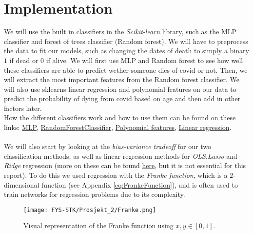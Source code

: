 \documentclass[english,notitlepage,reprint,nofootinbib]{revtex4-1}  %
\begin{document}
\section{Implementation}\label{sec: IMPLEMENTATION}
We will use the built in classifiers in the \emph{Scikit-learn} library, such as the MLP classifier and forest of trees classifier (Random forest). We will have to preprocess the data to fit our models, such as changing the dates of death to simply a binary $1$ if dead or $0$ if alive. We will first use MLP and Random forest to see how well these classifiers are able to predict wether someone dies of covid or not. Then, we will extract the most important features from the Random forest classifier. We will also use sklearns linear regression and polynomial features on our data to predict the probability of dying from covid based on age and then add in other factors later. 
\\
How the different classifiers work and how to use them can be found on these links: 
\href{https://scikit-learn.org/stable/modules/generated/sklearn.neural_network.MLPClassifier.html}{MLP},
\href{https://scikit-learn.org/stable/modules/generated/sklearn.ensemble.RandomForestClassifier.html}{RandomForestClassifier},
\href{https://scikit-learn.org/stable/modules/generated/sklearn.preprocessing.PolynomialFeatures.html}{Polynomial features},
\href{https://scik,it-learn.org/stable/modules/generated/sklearn.linear_model.LinearRegression.html}{Linear regression}.
\\
\\
We will also start by looking at the \textit{bias-variance tradeoff} for our two classification methods, as well as linear regression methods for \textit{OLS},\textit{Lasso} and \textit{Ridge} regression (more on these can be found \href{https://github.com/mathiasmellemstuen/FYS-STK4155-Prosjekt-1}{here}, but it is not essential for this report). To do this we used regression with the \textit{Franke function}, which is a $2$-dimensional function (see Appendix \ref{eq:FrankeFunction}), and is often used to train networks for regression problems due to its complexity. 

\begin{figure}[H]
    \centering
    \texttt{[image: FYS-STK/Prosjekt\_2/Franke.png]}
    \caption{Visual representation of the Franke function using $x,y \in [0,1]$.}
    \label{fig: 3}
\end{figure}
\end{document}
